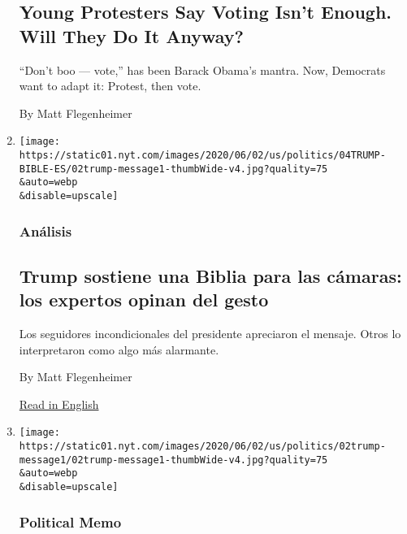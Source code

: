 \begin{enumerate}
  \hypertarget{young-protesters-say-voting-isnt-enough-will-they-do-it-anyway}{%
  \subsection{Young Protesters Say Voting Isn't Enough. Will They Do It
  Anyway?}\label{young-protesters-say-voting-isnt-enough-will-they-do-it-anyway}}

  ``Don't boo --- vote,'' has been Barack Obama's mantra. Now, Democrats
  want to adapt it: Protest, then vote.

  By Matt Flegenheimer
\item
  \href{/es/2020/06/04/espanol/mundo/trump-biblia.html}{}

  \texttt{[image: https://static01.nyt.com/images/2020/06/02/us/politics/04TRUMP-BIBLE-ES/02trump-message1-thumbWide-v4.jpg?quality=75\\\&auto=webp\\\&disable=upscale]}

  \hypertarget{anuxe1lisis}{%
  \subsubsection{Análisis}\label{anuxe1lisis}}

  \hypertarget{trump-sostiene-una-biblia-para-las-cuxe1maras-los-expertos-opinan-del-gesto}{%
  \subsection{Trump sostiene una Biblia para las cámaras: los expertos
  opinan del
  gesto}\label{trump-sostiene-una-biblia-para-las-cuxe1maras-los-expertos-opinan-del-gesto}}

  Los seguidores incondicionales del presidente apreciaron el mensaje.
  Otros lo interpretaron como algo más alarmante.

  By Matt Flegenheimer

  \href{https://www.nytimes.com/2020/06/02/us/politics/trump-holds-bible-photo.html}{Read
  in English}
\item
  \href{/2020/06/02/us/politics/trump-holds-bible-photo.html}{}

  \texttt{[image: https://static01.nyt.com/images/2020/06/02/us/politics/02trump-message1/02trump-message1-thumbWide-v4.jpg?quality=75\\\&auto=webp\\\&disable=upscale]}

  \hypertarget{political-memo}{%
  \subsubsection{Political Memo}\label{political-memo}}


\end{enumerate}
